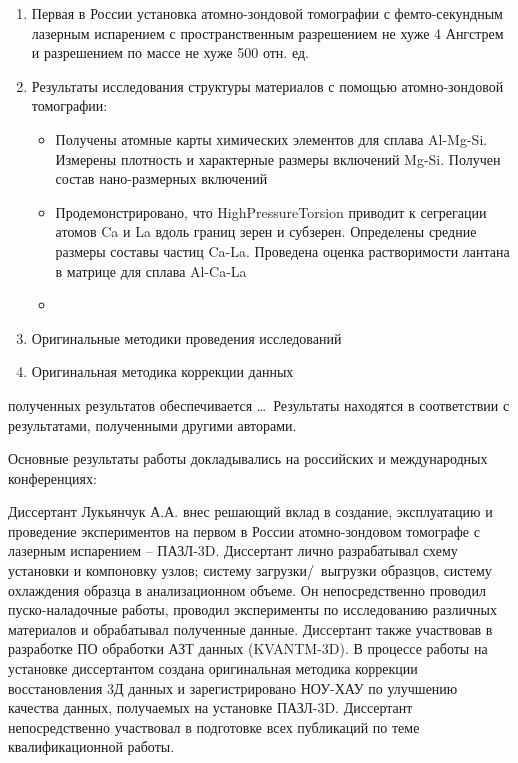 {}
\begin{enumerate}[beginpenalty=10000] %
  \item Первая в России установка атомно-зондовой томографии с фемто-секундным лазерным испарением с пространственным разрешением не хуже 4 Ангстрем и разрешением по массе не хуже 500 отн. ед.
  \item Результаты исследования структуры материалов с помощью атомно-зондовой томографии:
  	\begin{itemize}
  		\item Получены атомные карты химических элементов для сплава Al-Mg-Si. Измерены плотность и характерные размеры включений Mg-Si. Получен состав нано-размерных включений
  		\item Продемонстрировано, что HighPressureTorsion приводит к сегрегации атомов Ca и La вдоль границ зерен и субзерен. Определены средние размеры составы частиц Ca-La. Проведена оценка растворимости лантана в матрице для сплава Al-Ca-La
  		\item 
  	\end{itemize}
  \item Оригинальные методики проведения исследований
  \item Оригинальная методика коррекции данных
\end{enumerate}

{\reliability} полученных результатов обеспечивается \ldots \ Результаты находятся в соответствии с результатами, полученными другими авторами.


{\probation}
Основные результаты работы докладывались на российских и международных конференциях: 

{\contribution} Диссертант Лукьянчук А.А. внес решающий вклад в создание, эксплуатацию и проведение экспериментов на первом в России атомно-зондовом томографе с лазерным испарением – ПАЗЛ-3D. Диссертант лично разрабатывал схему установки и компоновку узлов; систему загрузки/~выгрузки образцов, систему охлаждения образца в анализационном объеме. Он непосредственно проводил пуско-наладочные работы, проводил эксперименты по исследованию различных материалов и обрабатывал полученные данные. Диссертант также участвовав в разработке ПО обработки АЗТ данных (KVANTM-3D). В процессе работы на установке диссертантом создана оригинальная методика коррекции восстановления 3Д данных и зарегистрировано НОУ-ХАУ по улучшению качества данных, получаемых на установке ПАЗЛ-3D. Диссертант непосредственно участвовал в подготовке всех публикаций по теме квалификационной работы.

